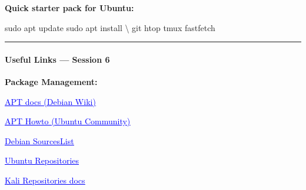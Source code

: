 \documentclass[
  english,
  paper=a4,
  oneside  ,captions=tableheading
]{scrartcl}
\newenvironment{Shaded}{}{}
\newcommand{\DataTypeTok}[1]{\textcolor[rgb]{0.56,0.13,0.00}{#1}}
\newcommand{\FunctionTok}[1]{\textcolor[rgb]{0.02,0.16,0.49}{#1}}
\newcommand{\NormalTok}[1]{#1}
\begin{document}
\textbf{Quick starter pack for Ubuntu:}

\begin{Shaded}
\begin{Highlighting}[]
\FunctionTok{sudo}\NormalTok{ apt update}
\FunctionTok{sudo}\NormalTok{ apt install }\DataTypeTok{\textbackslash{}}
\NormalTok{    git htop tmux fastfetch}
\end{Highlighting}
\end{Shaded}

\begin{center}\rule{0.5\linewidth}{0.5pt}\end{center}

\paragraph{Useful Links --- Session 6}\label{useful-links-session-6}

\textbf{Package Management:}

%
  \par\vspace{0.5ex}%
  \href{https://wiki.debian.org/Apt}{\textcolor{blue}{\underline{\faLink\quad APT docs (Debian Wiki)}}}%
  \par\vspace{0.5ex}%

%
  \par\vspace{0.5ex}%
  \href{https://help.ubuntu.com/community/AptGet/Howto}{\textcolor{blue}{\underline{\faLink\quad APT Howto (Ubuntu Community)}}}%
  \par\vspace{0.5ex}%

%
  \par\vspace{0.5ex}%
  \href{https://wiki.debian.org/SourcesList}{\textcolor{blue}{\underline{\faLink\quad Debian SourcesList}}}%
  \par\vspace{0.5ex}%

%
  \par\vspace{0.5ex}%
  \href{https://help.ubuntu.com/community/Repositories}{\textcolor{blue}{\underline{\faLink\quad Ubuntu Repositories}}}%
  \par\vspace{0.5ex}%

%
  \par\vspace{0.5ex}%
  \href{https://www.kali.org/docs/general-use/kali-linux-sources-list-repositories/}{\textcolor{blue}{\underline{\faLink\quad Kali Repositories docs}}}%
  \par\vspace{0.5ex}%
\end{document}
